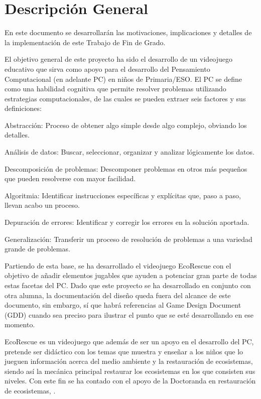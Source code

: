 \section{Descripción General}
En este documento se desarrollarán las motivaciones, implicaciones y detalles de la implementación de este Trabajo de Fin de Grado.

El objetivo general de este proyecto ha sido el desarrollo de un videojuego educativo que sirva como apoyo para el desarrollo del Pensamiento Computacional (en adelante PC) en niños de Primaria/ESO. El PC se define como una habilidad cognitiva que permite resolver problemas utilizando estrategias computacionales\cite{tesismaria}, de las cuales se pueden extraer seis factores y sus definiciones\cite{tesismaria}:
\begin{compactitem}
    \item Abstracción: Proceso de obtener algo simple desde algo complejo, obviando los detalles.
    \item Análisis de datos: Buscar, seleccionar, organizar y analizar lógicamente los datos. 
    \item Descomposición de problemas: Descomponer problemas en otros más pequeños que pueden resolverse con mayor facilidad. 
    \item Algoritmia: Identificar instrucciones específicas y explícitas que, paso a paso, llevan acabo un proceso.
    \item Depuración de errores: Identificar y corregir los errores en la solución aportada.
    \item Generalización: Transferir un proceso de resolución de problemas a una variedad grande de problemas.
\end{compactitem}

Partiendo de esta base, se ha desarrollado el videojuego EcoRescue con el objetivo de añadir elementos jugables que ayuden a potenciar gran parte de todas estas facetas del PC. Dado que este proyecto se ha desarrollado en conjunto con otra alumna, la documentación del diseño queda fuera del alcance de este documento, sin embargo, sí que habrá referencias al Game Design Document (GDD) cuando sea preciso para ilustrar el punto que se esté desarrollando en ese momento.

EcoRescue es un videojuego que además de ser un apoyo en el desarrollo del PC, pretende ser didáctico con los temas que muestra y enseñar a los niños que lo jueguen información acerca del medio ambiente y la restauración de ecosistemas, siendo así la mecánica principal restaurar los ecosistemas en los que consisten sus niveles. Con este fin se ha contado con el apoyo de la Doctoranda en restauración de ecosistemas, \nombreproductor.

